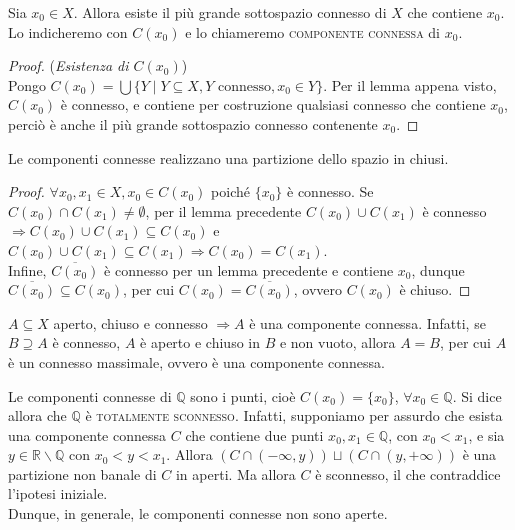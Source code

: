 \begin{defn}
Sia $x_0 \in X$. Allora esiste il più grande sottospazio connesso di $X$ che contiene $x_0$. Lo indicheremo con $C(x_0)$ e lo chiameremo \textsc{componente connessa} di $x_0$.
\end{defn}
\begin{proof}(\emph{Esistenza di $C(x_0)$})\\
Pongo $C(x_0)=\bigcup \{Y \mid Y \subseteq X, Y \text{ connesso},x_0 \in Y\}$. Per il lemma appena visto, $C(x_0)$ è connesso, e contiene per costruzione qualsiasi connesso che contiene $x_0$, perciò è anche il più grande sottospazio connesso contenente $x_0$.
\end{proof}

\begin{prop}
Le componenti connesse realizzano una partizione dello spazio in chiusi.
\end{prop}
\begin{proof}
$\forall x_0,x_1 \in X, x_0 \in C(x_0)$ poiché $\{x_0\}$ è connesso. Se $C(x_0) \cap C(x_1) \neq \emptyset$, per il lemma precedente $C(x_0) \cup C(x_1)$ è connesso $\Longrightarrow C(x_0) \cup C(x_1) \subseteq C(x_0)$ e $C(x_0) \cup C(x_1) \subseteq C(x_1) \Longrightarrow C(x_0)=C(x_1)$.\\
Infine, $\overline{C(x_0)}$ è connesso per un lemma precedente e contiene $x_0$, dunque $\overline{C(x_0)} \subseteq C(x_0)$, per cui $C(x_0)=\overline{C(x_0)}$, ovvero $C(x_0)$ è chiuso.
\end{proof}

\begin{oss}
$A \subseteq X$ aperto, chiuso e connesso $\Longrightarrow A$ è una componente connessa. Infatti, se $B \supseteq A$ è connesso, $A$ è aperto e chiuso in $B$ e non vuoto, allora $A=B$, per cui $A$ è un connesso massimale, ovvero è una componente connessa.
\end{oss}

\begin{oss}
Le componenti connesse di $\mathbb{Q}$ sono i punti, cioè $C(x_0)=\{x_0\}$, $\forall x_0 \in \mathbb{Q}$. Si dice allora che $\mathbb{Q}$ è \textsc{totalmente sconnesso}. Infatti, supponiamo per assurdo che esista una componente connessa $C$ che contiene due punti $x_0,x_1 \in \mathbb{Q}$, con $x_0<x_1$, e sia $y \in \mathbb{R} \smallsetminus \mathbb{Q}$ con $x_0<y<x_1$. Allora $(C \cap (-\infty,y))\sqcup (C \cap (y,+\infty))$ è una partizione non banale di $C$ in aperti. Ma allora $C$ è sconnesso, il che contraddice l'ipotesi iniziale. \\
Dunque, in generale, le componenti connesse non sono aperte.
\end{oss}

